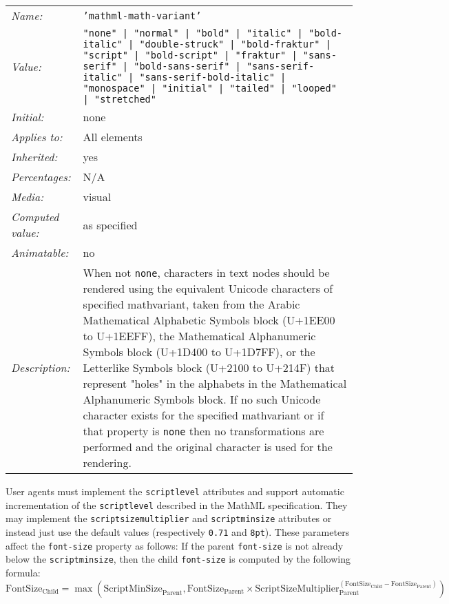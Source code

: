 \begin{table}
\begin{tabular}{ll}
  \emph{Name:} & {\tt 'mathml-math-variant'} \\
  \emph{Value:} & {\tt "none" | "normal" | "bold" | "italic" | "bold-italic" |
  "double-struck" | "bold-fraktur" | "script" | "bold-script" | "fraktur" |
  "sans-serif" | "bold-sans-serif" | "sans-serif-italic" |
  "sans-serif-bold-italic" | "monospace" | "initial" | "tailed" | "looped" |
  "stretched"} \\
  \emph{Initial:} & none \\
  \emph{Applies to:} & All elements \\
  \emph{Inherited:} & yes \\
  \emph{Percentages:} & N/A \\
  \emph{Media:} & visual \\
  \emph{Computed value:} & as specified \\
  \emph{Animatable:} & no \\
  \emph{Description:} & When not {\tt none}, characters in text nodes
  should be rendered using the equivalent Unicode characters of specified
  mathvariant, taken from the Arabic Mathematical Alphabetic Symbols block
  (U+1EE00 to U+1EEFF), the Mathematical Alphanumeric Symbols block
  (U+1D400 to U+1D7FF), or the Letterlike Symbols block (U+2100 to U+214F)
  that represent "holes" in the alphabets in the
  Mathematical Alphanumeric Symbols block. If no such Unicode character
  exists for the specified mathvariant or if that property is {\tt none} then
  no transformations are performed and the original character is used for the
  rendering.
\end{tabular}
\label{tab:CSSMathVariant}
\end{table}

User agents must implement the {\tt scriptlevel} attributes and support
automatic incrementation of the {\tt scriptlevel} described in the MathML
specification. They may implement the {\tt scriptsizemultiplier} and
{\tt scriptminsize} attributes or instead just use the default values
(respectively {\tt 0.71} and {\tt 8pt}). These parameters affect the
{\tt font-size} property as follows: If the parent
{\tt font-size} is not already below the {\tt scriptminsize}, then the
child {\tt font-size} is computed by the following formula:
%
\begin{equation}
\text{FontSize}_{\text{Child}} =
{\max \left(
  \text{ScriptMinSize}_{\text{Parent}},
  {\text{FontSize}_{\text{Parent}} \times
    {\text{ScriptSizeMultiplier}_{\text{Parent}}^
      {\left(\text{FontSize}_{\text{Child}} -
            \text{FontSize}_{\text{Parent}}\right)}
  }}
\right)}\label{eq:fontsize}
\end{equation}

